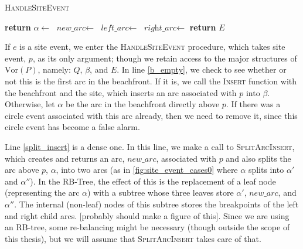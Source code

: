\documentclass[12pt,twoside]{reedthesis}
\begin{document}
    \begin{algorithm}[!htb]
    \caption{\textsc{HandleSiteEvent}}\label{HandleSiteEvent}
    \begin{algorithmic}[1]
     \label{b_empty}
      \State {}
      \State \textbf{return}
    \Else
      \State $\alpha\gets$  
        \State {}
      \EndIf 
      \State $\textit{new\_arc}\gets$ \label{split_insert}
      \State $\textit{left\_arc}\gets$ \label{get_left}
      \State $\textit{right\_arc}\gets$ \label{get_right}
      \State {}  \label{add_left}
      \State {} \label{add_right}
      \State {} 
      \State {} 
    \EndIf
    \State {}
    \State \textbf{return} $E$
    \EndProcedure
    \end{algorithmic} 
    \end{algorithm}

    If $e$ is a site event, we enter the \textsc{HandleSiteEvent} procedure, which takes site event, $p$, as its only argument; though we retain access to the major structures of $\mbox{Vor}(P)$, namely: $Q$, $\beta$, and $E$. In line \ref{b_empty}, we check to see whether or not this is the first arc in the beachfront. If it is, we call the \textsc{Insert} function with the beachfront and the site, which inserts an arc associated with $p$ into $\beta$. Otherwise, let $\alpha$ be the arc in the beachfront directly above $p$. If there was a circle event associated with this arc already, then we need to remove it, since this circle event has become a false alarm.\par

    Line \ref{split_insert} is a dense one. In this line, we make a call to \textsc{SplitArcInsert}, which creates and returns an arc, $\textit{new\_arc}$, associated with $p$ and also splits the arc above $p$, $\alpha$, into two arcs (as in \cref{fig:site_event_cases0} where $\alpha$ splits into $\alpha'$ and $\alpha''$). In the RB-Tree, the effect of this is the replacement of a leaf node (representing the arc $\alpha$) with a subtree whose three leaves store $\alpha'$, $\textit{new\_arc}$, and $\alpha''$. The internal (non-leaf) nodes of this subtree stores the breakpoints of the left and right child arcs. [probably should make a figure of this]. Since we are using an RB-tree, some re-balancing might be necessary (though outside the scope of this thesis), but we will assume that \textsc{SplitArcInsert} takes care of that.\par
\end{document}
